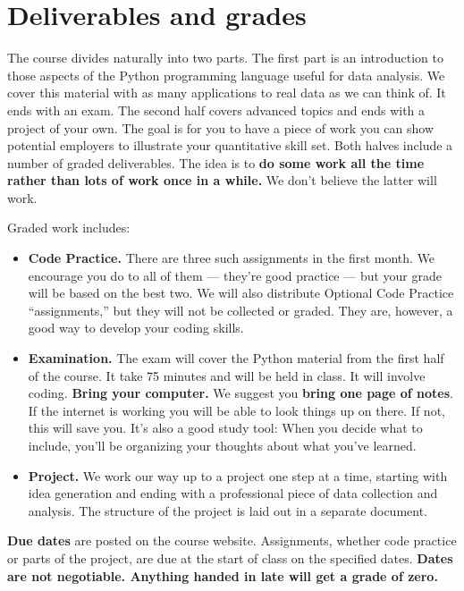 \documentclass[11pt]{article}
\begin{document}
\section*{Deliverables and grades}

The course divides naturally into two parts.
The first part is an introduction to those aspects of the Python programming language
useful for data analysis.
We cover this material with as many applications to real data as we can think of.
It ends with an exam.
The second half covers advanced topics and ends with a project of your own.
The goal is for you to have a piece of work you can show potential employers to
illustrate your quantitative skill set.
Both halves include a number of graded deliverables.
The idea is to {\bf do some work all the time rather than lots of work once in a while.}
We don't believe the latter will work.

Graded work includes:
%
\begin{itemize}

\item {\bf Code Practice.\/}
There are three such assignments in the first month.
We encourage you do to all of them --- they're good practice ---
but your grade will be based on the best two.
We will also distribute Optional Code Practice ``assignments,''
but they will not be collected or graded.
They are, however, a good way to develop your coding skills.  

\item {\bf Examination.\/}
The exam will cover the Python material from the first half of the course.
It take 75 minutes and will be held in class.
It will involve coding.
{\bf Bring your computer.\/}
We suggest you {\bf bring one page of notes\/}.
If the internet is working you will be able to look things up on there.  
If not, this will save you.  
It's also a good study tool:  When you decide what to include,
you'll be organizing your thoughts about what you've learned.

\item {\bf Project.\/}
We work our way up to a project one step at a time, starting with idea generation and ending
with a professional piece of data collection and analysis.
The structure of the project is laid out in a separate document.

\end{itemize}


{\bf Due dates} are posted on the course website.
Assignments, whether code practice or parts of the project,
are due at the start of class on the specified dates.
{\bf Dates are not negotiable.
Anything handed in late will get a grade of zero.\/}
\end{document}
